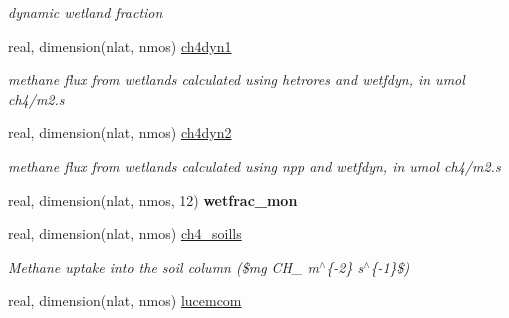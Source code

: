 \begin{DoxyCompactItemize}
\begin{DoxyCompactList}\small\item\em dynamic wetland fraction \end{DoxyCompactList}\item 
\hypertarget{structctem__statevars_1_1veg__rot_a2eb10dba403b8d7f1ac7357216ef570b}{}real, dimension(nlat, nmos) \hyperlink{structctem__statevars_1_1veg__rot_a2eb10dba403b8d7f1ac7357216ef570b}{ch4dyn1}\label{structctem__statevars_1_1veg__rot_a2eb10dba403b8d7f1ac7357216ef570b}

\begin{DoxyCompactList}\small\item\em methane flux from wetlands calculated using hetrores and wetfdyn, in umol ch4/m2.\+s \end{DoxyCompactList}\item 
\hypertarget{structctem__statevars_1_1veg__rot_a0309b9fafad808bb6150a65b8fb11632}{}real, dimension(nlat, nmos) \hyperlink{structctem__statevars_1_1veg__rot_a0309b9fafad808bb6150a65b8fb11632}{ch4dyn2}\label{structctem__statevars_1_1veg__rot_a0309b9fafad808bb6150a65b8fb11632}

\begin{DoxyCompactList}\small\item\em methane flux from wetlands calculated using npp and wetfdyn, in umol ch4/m2.\+s \end{DoxyCompactList}\item 
\hypertarget{structctem__statevars_1_1veg__rot_a4316aad91344809b8cd58ad483906dab}{}real, dimension(nlat, nmos, 12) {\bfseries wetfrac\+\_\+mon}\label{structctem__statevars_1_1veg__rot_a4316aad91344809b8cd58ad483906dab}

\item 
\hypertarget{structctem__statevars_1_1veg__rot_a32957dcdb26eedfb5de66513483dde81}{}real, dimension(nlat, nmos) \hyperlink{structctem__statevars_1_1veg__rot_a32957dcdb26eedfb5de66513483dde81}{ch4\+\_\+soills}\label{structctem__statevars_1_1veg__rot_a32957dcdb26eedfb5de66513483dde81}

\begin{DoxyCompactList}\small\item\em Methane uptake into the soil column (\$mg C\+H\+\_ m$^\wedge$\{-\/2\} s$^\wedge$\{-\/1\}\$) \end{DoxyCompactList}\item 
\hypertarget{structctem__statevars_1_1veg__rot_a9f2383e356c54e61a460c65f2b74bc05}{}real, dimension(nlat, nmos) \hyperlink{structctem__statevars_1_1veg__rot_a9f2383e356c54e61a460c65f2b74bc05}{lucemcom}\label{structctem__statevars_1_1veg__rot_a9f2383e356c54e61a460c65f2b74bc05}


\end{DoxyCompactItemize}
